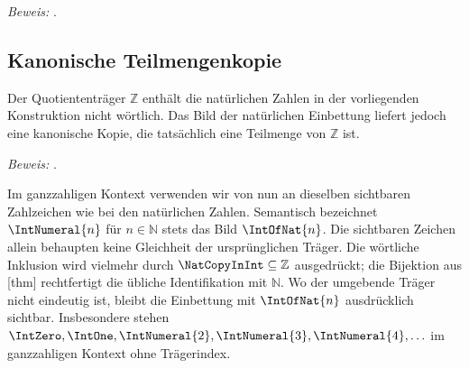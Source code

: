 \documentclass[main.tex]{subfiles}
\begin{document}
\par\noindent\emph{Beweis:} .\par


\subsection{Kanonische Teilmengenkopie}

Der Quotiententräger \(\mathbb Z\) enthält die natürlichen Zahlen in der
vorliegenden Konstruktion nicht wörtlich.  Das Bild der natürlichen
Einbettung liefert jedoch eine kanonische Kopie, die tatsächlich eine
Teilmenge von \(\mathbb Z\) ist.


\par\noindent\emph{Beweis:} .\par




Im ganzzahligen Kontext verwenden wir von nun an dieselben sichtbaren
Zahlzeichen wie bei den natürlichen Zahlen.  Semantisch bezeichnet
\(\IntNumeral{n}\) für \(n\in\mathbb N\) stets das Bild \(\IntOfNat{n}\).
Die sichtbaren Zeichen allein behaupten keine Gleichheit der ursprünglichen
Träger.  Die wörtliche Inklusion wird vielmehr durch
\(\NatCopyInInt\subseteq\mathbb Z\) ausgedrückt; die Bijektion aus
[thm]
rechtfertigt die übliche Identifikation mit \(\mathbb N\).  Wo der umgebende
Träger nicht eindeutig ist, bleibt die Einbettung mit \(\IntOfNat{n}\)
ausdrücklich sichtbar.
Insbesondere stehen \(\IntZero,\IntOne,\IntNumeral{2},\IntNumeral{3},
\IntNumeral{4},\ldots\) im ganzzahligen Kontext ohne Trägerindex.

\end{document}
